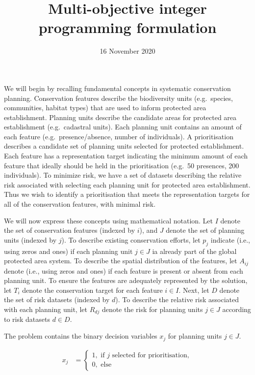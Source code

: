 \documentclass[
  11pt,
]{article}
\title{Multi-objective integer programming formulation}
\author{}
\date{\vspace{-2.5em}16 November 2020}
\begin{document}
\maketitle

We will begin by recalling fundamental concepts in systematic
conservation planning. Conservation features describe the biodiversity
units (e.g.~species, communities, habitat types) that are used to inform
protected area establishment. Planning units describe the candidate
areas for protected area establishment (e.g.~cadastral units). Each
planning unit contains an amount of each feature (e.g.~presence/absence,
number of individuals). A prioritisation describes a candidate set of
planning units selected for protected establishment. Each feature has a
representation target indicating the minimum amount of each feature that
ideally should be held in the prioritisation (e.g.~50 presences, 200
individuals). To minimize risk, we have a set of datasets describing the
relative risk associated with selecting each planning unit for protected
area establishment. Thus we wish to identify a prioritisation that meets
the representation targets for all of the conservation features, with
minimal risk.

We will now express these concepts using mathematical notation. Let
\(I\) denote the set of conservation features (indexed by \(i\)), and
\(J\) denote the set of planning units (indexed by \(j\)). To describe
existing conservation efforts, let \(p_j\) indicate (i.e., using zeros
and ones) if each planning unit \(j \in J\) ia already part of the
global protected area system. To describe the spatial distribution of
the features, let \(A_{ij}\) denote (i.e., using zeros and ones) if each
feature is present or absent from each planning unit. To ensure the
features are adequately represented by the solution, let \(T_i\) denote
the conservation target for each feature \(i \in I\). Next, let \(D\)
denote the set of risk datasets (indexed by \(d\)). To describe the
relative risk associated with each planning unit, let \(R_{dj}\) denote
the risk for planning units \(j \in J\) according to risk datasets
\(d \in D\).

\clearpage

The problem contains the binary decision variables \(x_j\) for planning
units \(j \in J\).

\begin{align*}
x_j &=
\begin{cases}
1, \text{ if $j$ selected for prioritisation}, \tag{eqn 1a} \\
0, \text{ else }
\end{cases} \\
\end{align*}
\end{document}
